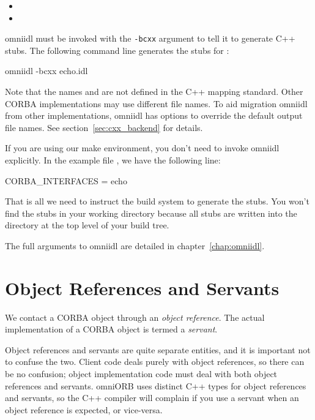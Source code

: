\documentclass[11pt,oneside,a4paper]{book}
\newcommand{\cmdline}[1]{\texttt{#1}}
\newcommand{\term}[1]{\textit{#1}}
\newenvironment{nsitemize}%
 {\begin{itemize}\setlength{\itemsep}{0pt}}%
 {\end{itemize}}
\begin{document}
\begin{nsitemize}
\item {}
\item {}
\end{nsitemize}

\noindent omniidl must be invoked with the \cmdline{-bcxx} argument to
tell it to generate C++ stubs. The following command line generates
the stubs for :

\begin{makelisting}
omniidl -bcxx echo.idl
\end{makelisting}

Note that the names  and  are not
defined in the C++ mapping standard. Other CORBA implementations may
use different file names. To aid migration omniidl from other
implementations, omniidl has options to override the default output
file names. See section~\ref{sec:cxx_backend} for details.


If you are using our make environment, you don't need to invoke
omniidl explicitly. In the example file , we have the
following line:

\begin{makelisting}
CORBA_INTERFACES = echo
\end{makelisting}

\noindent That is all we need to instruct the build system to generate
the stubs. You won't find the stubs in your working directory because
all stubs are written into the  directory at the top level
of your build tree.

The full arguments to omniidl are detailed in
chapter~\ref{chap:omniidl}.


\section{Object References and Servants}

We contact a CORBA object through an \term{object reference}. The
actual implementation of a CORBA object is termed a \term{servant}.

Object references and servants are quite separate entities, and it is
important not to confuse the two. Client code deals purely with object
references, so there can be no confusion; object implementation code
must deal with both object references and servants. omniORB uses
distinct C++ types for object references and servants, so the C++
compiler will complain if you use a servant when an object reference
is expected, or vice-versa.
\end{document}
